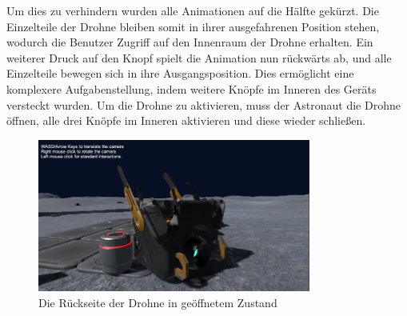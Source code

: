 Um dies zu verhindern wurden alle Animationen auf die Hälfte gekürzt. Die Einzelteile der Drohne bleiben somit in ihrer ausgefahrenen Position stehen, wodurch die Benutzer Zugriff auf den Innenraum der Drohne erhalten. Ein weiterer Druck auf den Knopf spielt die Animation nun rückwärts ab, und alle Einzelteile bewegen sich in ihre Ausgangsposition. Dies ermöglicht eine komplexere Aufgabenstellung, indem weitere Knöpfe im Inneren des Geräts versteckt wurden. Um die Drohne zu aktivieren, muss der Astronaut die Drohne öffnen, alle drei Knöpfe im Inneren aktivieren und diese wieder schließen.

\begin{figure}[H]
\centering
\includegraphics[width=0.8\textwidth]{DrohneOffen.PNG}
\caption{Die Rückseite der Drohne in geöffnetem Zustand}
\end{figure}

